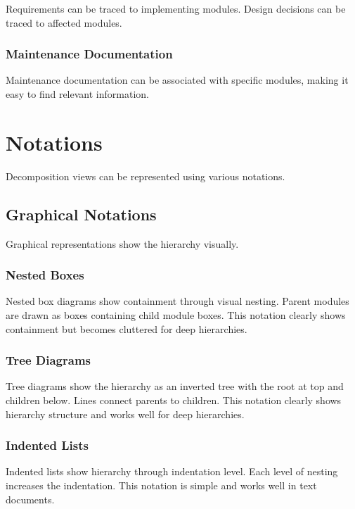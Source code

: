 \documentclass[11pt]{article}
\begin{document}
Requirements can be traced to implementing modules. Design decisions can be traced to affected modules.

\subsubsection{Maintenance Documentation}

Maintenance documentation can be associated with specific modules, making it easy to find relevant information.

\section{Notations}

Decomposition views can be represented using various notations.

\subsection{Graphical Notations}

Graphical representations show the hierarchy visually.

\subsubsection{Nested Boxes}

Nested box diagrams show containment through visual nesting. Parent modules are drawn as boxes containing child module boxes. This notation clearly shows containment but becomes cluttered for deep hierarchies.

\subsubsection{Tree Diagrams}

Tree diagrams show the hierarchy as an inverted tree with the root at top and children below. Lines connect parents to children. This notation clearly shows hierarchy structure and works well for deep hierarchies.

\subsubsection{Indented Lists}

Indented lists show hierarchy through indentation level. Each level of nesting increases the indentation. This notation is simple and works well in text documents.
\end{document}
